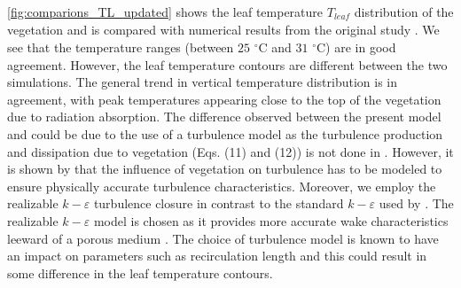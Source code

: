 \cref{fig:comparions_TL_updated} shows the leaf temperature $T_{\mathit{leaf}}$ distribution of the vegetation and is compared with numerical results from the original study \citep{Kichah2012}. We see that the temperature ranges (between $25$ $^{\circ}$C and $31$ $^{\circ}$C) are in good agreement. However, the leaf temperature contours are different between the two simulations. The general trend in vertical temperature distribution is in agreement, with peak temperatures appearing close to the top of the vegetation due to radiation absorption. The difference observed between the present model and \cite{Kichah2012} could be due to the use of a turbulence model as the turbulence production and dissipation due to vegetation (Eqs. (11) and (12)) is not done in \cite{Kichah2012}. However, it is shown by \cite{Sanz2003} that the influence of vegetation on turbulence has to be modeled to ensure physically accurate turbulence characteristics. Moreover, we employ the realizable $k-\varepsilon$ turbulence closure in contrast to the standard $k-\varepsilon$ used by \cite{Kichah2012}. The realizable $k-\varepsilon$ model is chosen as it provides more accurate wake characteristics leeward of a porous medium \citep{Santiago2007, Shih1995}. The choice of turbulence model is known to have an impact on parameters such as recirculation length \citep{Santiago2007} and this could result in some difference in the leaf temperature contours. 


